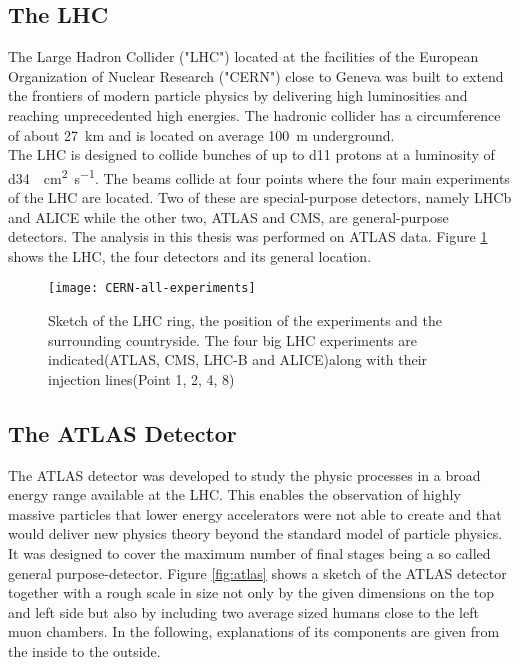 \subsection{The LHC}

The Large Hadron Collider ("LHC") located at the facilities of the European Organization of Nuclear Research ("CERN") close to Geneva was built to extend the frontiers of modern particle physics by delivering high luminosities and reaching unprecedented high energies. The hadronic collider has a circumference of about \SI{27}{\km} and is located on average \SI{100}{\meter} underground.\\
The LHC is designed to collide bunches of up to \num{d11} protons at a luminosity of \SI{d34}{\per\square\cm \per\s}. The beams collide at four points where the four main experiments of the LHC are located. Two of these are special-purpose detectors, namely LHCb and ALICE while the other two, ATLAS and CMS, are general-purpose detectors.
The analysis in this thesis was performed on ATLAS data.
Figure \ref{fig:LHC} shows the LHC, the four detectors and its general location.
\begin{figure}[h]
  \centering
  \texttt{[image: CERN-all-experiments]}
  \caption[Sketch of the LHC ring, the position of the experiments and
  the surrounding countryside.]{Sketch of the LHC ring, the position
    of the experiments and the surrounding countryside. The four big
    LHC experiments are indicated(ATLAS, CMS, LHC-B and ALICE)along with their injection lines(Point 1, 2, 4, 8)\cite{atlasfigures}}
  \label{fig:LHC}
\end{figure}


\subsection{The ATLAS Detector}

The ATLAS detector was developed to study the physic processes in a broad energy range available at the LHC. This enables the observation of highly massive particles that lower energy accelerators were not able to create and that would deliver new physics theory beyond the standard model of particle physics.
It was designed to cover the maximum number of final stages being a so called general purpose-detector.
Figure \ref{fig:atlas} shows a sketch of the ATLAS detector together with a rough scale in size not only by the given dimensions on the top and left side but also by including two average sized humans close to the left muon chambers. In the following, explanations of its components are given from the inside to the outside.

